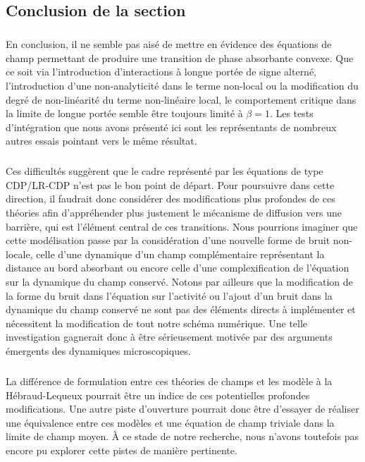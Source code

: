 \subsection{Conclusion de la section}

\subparagraph{}En conclusion, il ne semble pas aisé de mettre en évidence des équations de champ permettant de produire une transition de phase absorbante convexe. Que ce soit via l'introduction d'interactions à longue portée de signe alterné, l'introduction d'une non-analyticité dans le terme non-local ou la modification du degré de non-linéarité du terme non-linéaire local, le comportement critique dans la limite de longue portée semble être toujours limité à $\beta = 1$. Les tests d'intégration que nous avons présenté ici sont les représentants de nombreux autres essais pointant vers le même résultat. 

\subparagraph{}Ces difficultés suggèrent que le cadre représenté par les équations de type CDP/LR-CDP n'est pas le bon point de départ. Pour poursuivre dans cette direction, il faudrait donc considérer des modifications plus profondes de ces théories afin d'appréhender plus justement le mécanisme de diffusion vers une barrière, qui est l'élément central de ces transitions. Nous pourrions imaginer que cette modélisation passe par la considération d'une nouvelle forme de bruit non-locale, celle d'une dynamique d'un champ complémentaire représentant la distance au bord absorbant ou encore celle d'une complexification de l'équation sur la dynamique du champ conservé. Notons par ailleurs que la modification de la forme du bruit dans l'équation sur l'activité ou l'ajout d'un bruit dans la dynamique du champ conservé ne sont pas des éléments directs à implémenter et nécessitent la modification de tout notre schéma numérique. Une telle investigation gagnerait donc à être sérieusement motivée par des arguments émergents des dynamiques microscopiques.

\subparagraph{}La différence de formulation entre ces théories de champs et les modèle à la Hébraud-Lequeux pourrait être un indice de ces potentielles profondes modifications. Une autre piste d'ouverture pourrait donc être d'essayer de réaliser une équivalence entre ces modèles et une équation de champ triviale dans la limite de champ moyen. \`A ce stade de notre recherche, nous n'avons toutefois pas encore pu explorer cette pistes de manière pertinente.

